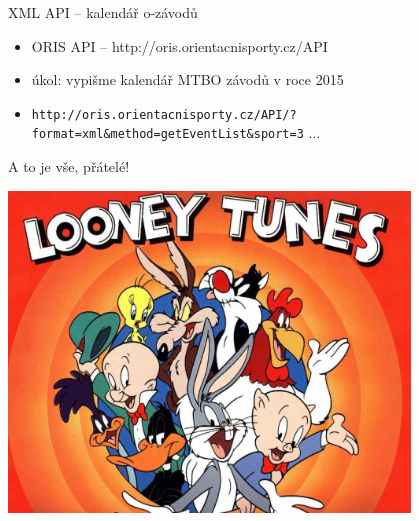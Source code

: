 \documentclass{beamer}
\begin{document}
\begin{frame}{XML API -- kalendář o-závodů}
  \begin{itemize}
    \item ORIS API -- http://oris.orientacnisporty.cz/API
    \item úkol: vypišme kalendář MTBO závodů v roce 2015
    \item \texttt{http://oris.orientacnisporty.cz/API/?format=xml\&method=getEventList\&sport=3} ...
  \end{itemize}
\end{frame}



\begin{frame}{A to je vše, přátelé!}
  \begin{center}
    \includegraphics[width=0.8\textwidth]{looney_tunes}
  \end{center}
\end{frame}
\end{document}
